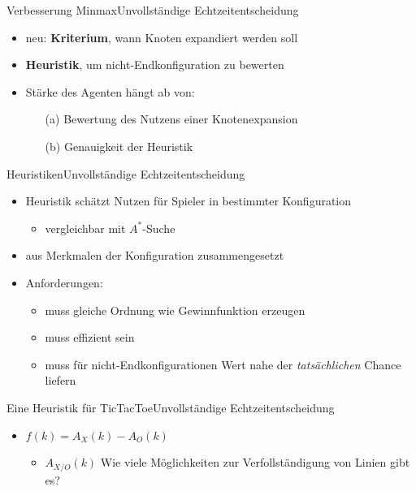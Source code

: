 \documentclass[18pt, aspectratio=169, handout]{beamer}
\newcommand\q[1]{\glqq #1\grqq}
\begin{document}
\begin{frame}{Verbesserung Minmax}{Unvollständige Echtzeitentscheidung}
	\begin{itemize}
	\item
	  neu: \textbf{Kriterium}, wann Knoten expandiert werden soll
	  \pause
	\item
	  \textbf{Heuristik}, um nicht-Endkonfiguration zu bewerten
	  \pause
	\item
	  Stärke des Agenten hängt ab von:
	  \begin{itemize}
	  \item[(a)] Bewertung des Nutzens einer Knotenexpansion
	  \item[(b)] Genauigkeit der Heuristik
		\end{itemize}
	\end{itemize}
\end{frame}

\begin{frame}{Heuristiken}{Unvollständige Echtzeitentscheidung}

\begin{itemize}
\item
  Heuristik schätzt Nutzen für Spieler in bestimmter Konfiguration
  \begin{itemize}
  	\item vergleichbar mit $A^*$-Suche
  \end{itemize}
  \pause
  \item
  aus Merkmalen der Konfiguration zusammengesetzt
	\item
	\pause
  Anforderungen:
  \begin{itemize}
  \item
    muss gleiche Ordnung wie Gewinnfunktion erzeugen
    \pause
  \item
    muss effizient sein
    \pause
  \item
    muss für nicht-Endkonfigurationen Wert nahe der \textit{tatsächlichen} Chance liefern
  \end{itemize}
\end{itemize}
\end{frame}

\begin{frame}{Eine Heuristik für TicTacToe}{Unvollständige Echtzeitentscheidung}
	\begin{itemize}
  	\item $f(k) = A_X(k) - A_O(k)$
  		\begin{itemize}
  			\item $A_{X/O}(k)$ \quad \q{Wie viele Möglichkeiten zur Verfollständigung von Linien gibt es?}
  		\end{itemize}
  \end{itemize}
\end{frame}
\end{document}
